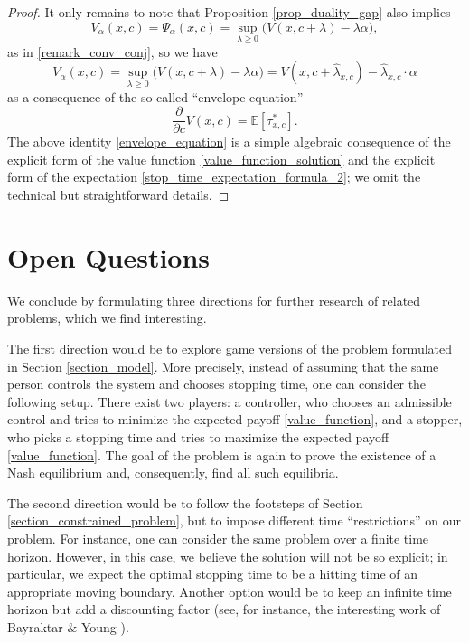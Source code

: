 \documentclass[11pt,tbtags,reqno]{article}
\theoremstyle{definition}
\numberwithin{equation}{section}
\theoremstyle{definition}
\newcommand{\ex}{\mathbb{E}}
\begin{document}
\begin{proof}
It only remains to note that Proposition \ref{prop_duality_gap} also implies 
\begin{equation}
    V_\alpha(x, c) 
    =
    \Psi_\alpha(x, c) 
    =
    \sup_{\lambda \ge 0}
    \big(
        V(x, c + \lambda) - \lambda \alpha
    \big),
\end{equation}
as in \eqref{remark_conv_conj}, so we have 
\begin{equation}
    V_\alpha(x, c) 
    = 
    \sup_{\lambda \ge 0}
    \big(
        V(x, c + \lambda) - \lambda \alpha
    \big)
    =
    V\left(x, c + \widehat{\lambda}_{x, c}\right) - \widehat{\lambda}_{x, c} \cdot \alpha
\end{equation}
as a consequence of the so-called ``envelope equation''
\begin{equation}\label{envelope_equation}
    \frac{\partial}{\partial c} V(x, c) = \ex\left[ \tau^*_{x, c}\right].
\end{equation}
The above identity \eqref{envelope_equation} is a simple algebraic consequence of the explicit form of the value function \eqref{value_function_solution} and the explicit form of the expectation \eqref{stop_time_expectation_formula_2}; we omit the technical but straightforward details.
\end{proof}

\section{Open Questions}\label{section_open_questions}

We conclude by formulating three directions for further research of related problems, which we find interesting.

The first direction would be to explore game versions of the problem formulated in Section \ref{section_model}. More precisely, instead of assuming that the same person controls the system and chooses stopping time, one can consider the following setup. There exist two players: a controller, who chooses an admissible control and tries to minimize the expected payoff \eqref{value_function}, and a stopper, who picks a stopping time and tries to maximize the expected payoff \eqref{value_function}. The goal of the problem is again to prove the existence of a Nash equilibrium and, consequently, find all such equilibria. 

The second direction would be to follow the footsteps of Section \ref{section_constrained_problem}, but to impose different time ``restrictions'' on our problem. For instance, one can consider the same problem over a finite time horizon. However, in this case, we believe the solution will not be so explicit; in particular, we expect the optimal stopping time to be a hitting time of an appropriate moving boundary. Another option would be to keep an infinite time horizon but add a discounting factor (see, for instance, the interesting work of Bayraktar \& Young \cite{BayYou11}). 
\end{document}
